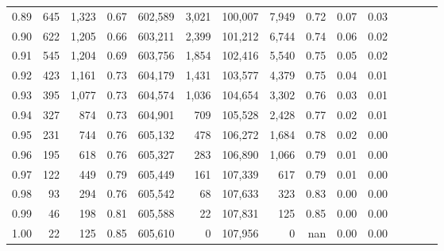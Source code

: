 \begin{tabular}{rrrcrrrrrrrrrrr}
0.89 &     645 &  1,323 &                                       0.67 &  602,589 &    3,021 &  100,007 &    7,949 &  0.72 &  0.07 &                         0.03 \\
0.90 &     622 &  1,205 &                                       0.66 &  603,211 &    2,399 &  101,212 &    6,744 &  0.74 &  0.06 &                         0.02 \\
0.91 &     545 &  1,204 &                                       0.69 &  603,756 &    1,854 &  102,416 &    5,540 &  0.75 &  0.05 &                         0.02 \\
0.92 &     423 &  1,161 &                                       0.73 &  604,179 &    1,431 &  103,577 &    4,379 &  0.75 &  0.04 &                         0.01 \\
0.93 &     395 &  1,077 &                                       0.73 &  604,574 &    1,036 &  104,654 &    3,302 &  0.76 &  0.03 &                         0.01 \\
0.94 &     327 &    874 &                                       0.73 &  604,901 &      709 &  105,528 &    2,428 &  0.77 &  0.02 &                         0.01 \\
0.95 &     231 &    744 &                                       0.76 &  605,132 &      478 &  106,272 &    1,684 &  0.78 &  0.02 &                         0.00 \\
0.96 &     195 &    618 &                                       0.76 &  605,327 &      283 &  106,890 &    1,066 &  0.79 &  0.01 &                         0.00 \\
0.97 &     122 &    449 &                                       0.79 &  605,449 &      161 &  107,339 &      617 &  0.79 &  0.01 &                         0.00 \\
0.98 &      93 &    294 &                                       0.76 &  605,542 &       68 &  107,633 &      323 &  0.83 &  0.00 &                         0.00 \\
0.99 &      46 &    198 &                                       0.81 &  605,588 &       22 &  107,831 &      125 &  0.85 &  0.00 &                         0.00 \\
1.00 &      22 &    125 &                                       0.85 &  605,610 &        0 &  107,956 &        0 &   nan &  0.00 &                         0.00 \\
\bottomrule
\end{tabular}
